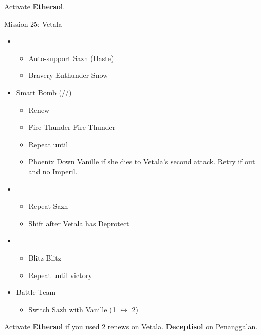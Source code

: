\begin{multicols}{2}
\newpage
Activate \textbf{Ethersol}.
\renewcommand{\fifth}{[5] Smart Bomb (\rav/\sab/\rav)}
\begin{battle}{Mission 25: Vetala}
\begin{itemize}
    \item \first
    \begin{itemize}
        \item Auto-support Sazh (Haste)
        \item Bravery-Enthunder Snow
    \end{itemize}
    \item \fifth
    \begin{itemize}
        \item Renew
        \item Fire-Thunder-Fire-Thunder
        \item Repeat until \stagger
        \item Phoenix Down Vanille if she dies to Vetala's second attack. Retry if out and no Imperil.
    \end{itemize}
    \columnbreak
    \item \first
    \begin{itemize}
        \item Repeat Sazh
        \item Shift after Vetala has Deprotect
    \end{itemize}
    \item \second
    \begin{itemize}
        \item Blitz-Blitz
        \item Repeat until victory
    \end{itemize}
\end{itemize}
\end{battle}
\begin{menu}
\begin{itemize}
    \paradigm
    \begin{itemize}
        \item {}%
{\paradigmline{\syn}{(\rav)}{(\sen)}}%
{\paradigmline[2]{\textit{\com}}{\textit{(\rav)}}{\textit{(\rav)}}}%
{\paradigmline{(\rav)}{(\rav)}{(\sen)}}%
{\paradigmline{\com}{(\rav)}{\com}}%
{\paradigmline{\rav}{\sab}{(\sen)}}%
{\paradigmline{\com}{\rav}{\com}}
    \end{itemize}
    \item Battle Team
    \begin{itemize}
        \item Switch Sazh with Vanille (1 $\leftrightarrow$ 2)
    \end{itemize}
\end{itemize}
\end{menu}
 Activate \textbf{Ethersol} if you used 2 renews on Vetala. \textbf{Deceptisol} on Penanggalan.
\renewcommand{\second}{[2] Relentless Assault (\rav/\rav/\com)}
\renewcommand{\third}{[3] Mystic Tower (\rav/\rav/\sen)}


\end{multicols}
